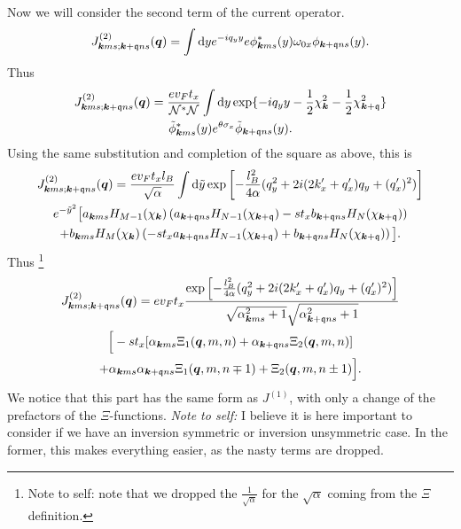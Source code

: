 Now we will consider the second term of the current operator.
\begin{equation}
  \label{eq:74}
  J_{\bm{k} m s; \bm{k} + \mathfrak{q} n s}^{(2)} (\bm{q}) =
  \int \mathrm{d} y
  e^{-iq_{y} y} e
  \phi ^{*}_{\bm{k} m s}(y) \omega _{0 x} \phi _{\bm{k} + \mathfrak{q} n s}(y).
\end{equation}
Thus
\begin{multline}
  \label{eq:75}
  J_{\bm{k} m s; \bm{k} + \mathfrak{q} n s}^{(2)} (\bm{q}) =
  \frac{e v_F t_x }{\mathcal{N}^{*} \mathcal{N}}
  \int \mathrm{d} y
  \exp\{-i q_{y} y - \frac{1}{2} \chi_{\bm{k}} ^2 - \frac{1}{2} \chi _{\bm{k} + \mathfrak{q}}^2\} \\
  \tilde{\phi} ^{*}_{\bm{k} m s}(y) e^{\theta \sigma _{x}} \tilde{\phi} _{\bm{k} + \mathfrak{q} n s}(y).
\end{multline}
Using the same substitution and completion of the square as above, this is
\begin{multline}
  \label{eq:76}
  J_{\bm{k} m s; \bm{k} + \mathfrak{q} n s}^{(2)} (\bm{q}) =
  \frac{e v_F t_x l_{B}}{\sqrt{\alpha}}
  \int \mathrm{d} \tilde{y}
    \exp \left[
      -\frac{l_{B}^2}{4 \alpha } (q_{y}^2 + 2i (2 k'_x + q' _x) q_{y}  + (q'_x)^2 )
    \right]\\
  e^{-\tilde{y}^2} \big[
    a_{\bm{k} m s} H_{M-1}( \chi _{\bm{k}} ) \left(a_{\bm{k} + \mathfrak{q} n s} H_{N-1}( \chi _{\bm{k} + \mathfrak{q}} ) - s t_{x} b_{\bm{k} + \mathfrak{q} n s} H_{N}( \chi _{\bm{k} + \mathfrak{q}} ) \right)\\
   +
    b_{\bm{k} m s} H_{M}( \chi _{\bm{k}} ) \left(- s t_{x} a_{\bm{k} + \mathfrak{q} n s} H_{N-1}( \chi _{\bm{k} + \mathfrak{q}} ) + b_{\bm{k} + \mathfrak{q} n s} H_{N}( \chi _{\bm{k} + \mathfrak{q}} ) \right)
    \big].
\end{multline}
Thus
\footnote{Note to self: note that we dropped the \( \frac{1}{\sqrt{\alpha } } \) for the \( \sqrt{\alpha }  \) coming from the \( \Xi  \) definition.}
\begin{multline}
  J_{\bm{k} m s; \bm{k} + \mathfrak{q} n s}^{(2)} (\bm{q}) =
  e v_F t_x
  \frac{
    \exp \left[
      -\frac{l_{B}^2}{4 \alpha } (q_{y}^2 + 2i (2 k' _x + q' _x) q_{y} + (q'_x)^2 )
    \right]
  }{
    \sqrt{\alpha_{\bm{k} m s}^2 + 1} \sqrt{\alpha _{\bm{k}+\mathfrak{q} n s}^2 + 1}
  }\\
  \Big[
  -s t_x [ \alpha_{\bm{k} m s} \Xi_1(\bm{q}, m, n) + \alpha_{\bm{k} + \mathfrak{q} n s} \Xi_2(\bm{q}, m, n) ]\\
  + \alpha_{\bm{k} m s} \alpha_{\bm{k} + \mathfrak{q} ns} \Xi_1(\bm{q}, m, n\mp 1)
  + \Xi_2(\bm{q}, m, n \pm 1) \Big].
\end{multline}
We notice that this part has the same form as \( J^{(1)} \), with only a change of the prefactors of the \( \Xi  \)-functions.
\emph{Note to self: } I believe it is here important to consider if we have an inversion symmetric or inversion unsymmetric case. In the former, this makes everything easier, as the nasty terms are dropped.

